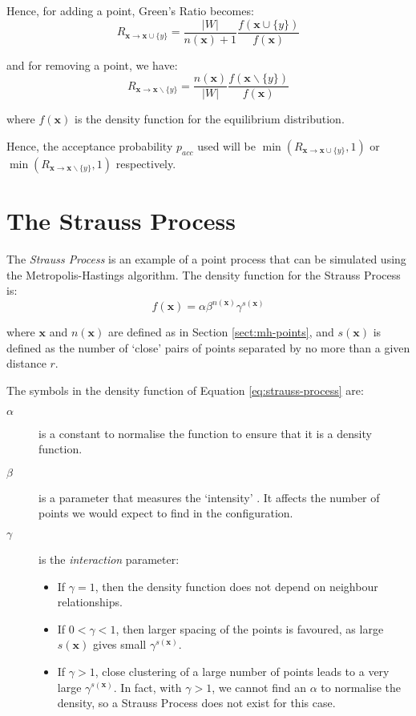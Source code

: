 Hence, for adding a point, Green's Ratio becomes:
\begin{equation}
  R_{\mathbf{x} \to \mathbf{x} \cup \{y\}} = \frac{|W|}{n(\mathbf{x})
  + 1} \frac{f(\mathbf{x} \cup \{y\})}{f(\mathbf{x})}
\end{equation}

\noindent and for removing a point, we have:
\begin{equation}
  R_{\mathbf{x} \to \mathbf{x} \backslash \{y\}} =
  \frac{n(\mathbf{x})}{|W|} \frac{f(\mathbf{x} \backslash
  \{y\})}{f(\mathbf{x})}
\end{equation}

\noindent where $f(\mathbf{x})$ is the density function for the
equilibrium distribution.

Hence, the acceptance probability $p_{acc}$ used will be $\min(R_{\mathbf{x} \to
\mathbf{x} \cup \{y\}}, 1)$ or $\min(R_{\mathbf{x} \to \mathbf{x}
\backslash \{y\}}, 1)$ respectively.


\section{The Strauss Process}\label{sect:strauss-process}

The \emph{Strauss Process} \cite{strauss-process} is an example of a
point process that can be simulated using the Metropolis-Hastings
algorithm.  The density function for the Strauss Process is:
\begin{equation}\label{eq:strauss-process}
f(\mathbf{x}) = \alpha \beta^{n(\mathbf{x})} \gamma^{s(\mathbf{x})}
\end{equation}

\noindent where $\mathbf{x}$ and $n(\mathbf{x})$ are defined as in
Section \ref{sect:mh-points}, and $s(\mathbf{x})$ is defined as the
number of `close' pairs of points separated by no more than a given
distance $r$.

The symbols in the density function of Equation
\ref{eq:strauss-process} are:
\begin{description}
\item[$\alpha$] is a constant to normalise the function to ensure that it
is a density function.
\item[$\beta$] is a parameter that measures the `intensity' .  It
affects the number of points we would expect to find in the
configuration.
\item[$\gamma$] is the \emph{interaction} parameter:
  \begin{itemize}
  \item If $\gamma = 1$, then the density function does not depend on
  neighbour relationships.
  \item If $0 < \gamma < 1$, then larger spacing of the points is
  favoured, as large $s(\mathbf{x})$ gives small
  $\gamma^{s(\mathbf{x})}$.
  \item If $\gamma > 1$, close clustering of a large number of points
  leads to a very large $\gamma^{s(\mathbf{x})}$.  In fact, with
  $\gamma > 1$, we cannot find an $\alpha$ to normalise the density, so
  a Strauss Process does not exist for this case.
  \end{itemize}
\end{description}


